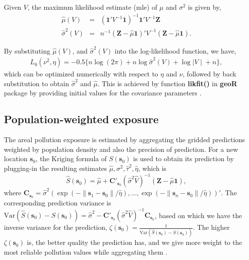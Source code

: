 \documentclass[12,]{article}
\begin{document}
Given \(V\), the maximum likelihood estimate (mle) of \(\mu\) and
\(\sigma^2\) is given by, \begin{eqnarray}
\hat{\mu} (V) &=& (\symbf{1}\prime V^{-1}\symbf{1})^{-1}\symbf{1}\prime V^{-1}\symbf{Z}\\\nonumber
\hat{\sigma}^2(V) &=& n^{-1}(\symbf{Z}- \hat{\mu}\symbf{1})\prime V^{-1} (\symbf{Z} - \hat{\mu}\symbf{1}).
\label{eq:gle}
\end{eqnarray}

By substituting \(\hat{\mu} (V)\), and \(\hat{\sigma}^2 (V)\) into the
log-likelihood function, we have, \begin{eqnarray}
L_0(\nu^2,\eta) = -0.5\{n\log(2\pi)+n\log \hat{\sigma}^2(V) + \log{\mid V\mid}+n\},
\label{eq:likelihood0}
\end{eqnarray} which can be optimized numerically with respect to
\(\eta\) and \(\nu\), followed by back substitution to obtain
\(\hat{\sigma}^2\) and \(\hat{\mu}\). This is achieved by function
\textbf{likfit()} in \textbf{geoR} package by providing initial values
for the covariance parameters \autocite{Diggle2007}.

\hypertarget{sec:weightedexposure}{%
\subsection{Population-weighted exposure}\label{sec:weightedexposure}}

The areal pollution exposure is estimated by aggregating the gridded
predictions weighted by population density and also the precision of
prediction. For a new location \(\symbf{s}_0\), the Kriging formula of
\(S(\symbf{s}_0)\) \autocite{Diggle2007} is used to obtain its
prediction by plugging-in the resulting estimates
\(\hat{\mu}, \sigma^2, \hat{\tau}^2, \hat{\eta}\), which is
\begin{equation}
\hat{S}(\symbf{s}_0) = \hat{\mu}+ \symbf{C}\prime_{\symbf{s}_0} (\hat{\sigma}^2 \hat{V})^{-1}(\symbf{Z}-\hat{\mu}\symbf{1}),
\label{eq:prediction}
\end{equation} where
\(\symbf{C}_{\symbf{s}_0}=\hat{\sigma}^2(\exp(-\|\symbf{s}_1-\symbf{s}_0\|/\hat{\eta}),\dots,\exp(-\|\symbf{s}_n-\symbf{s}_0\|/\hat{\eta}))\prime\).
The corresponding prediction variance is
\(\mbox{Var}(\hat{S}(\symbf{s}_0)-S(\symbf{s}_0))=\hat{\sigma}^2-\symbf{C}\prime_{\symbf{s}_0} (\hat{\sigma}^2 \hat{V})^{-1}\symbf{C}_{\symbf{s}_0}\),
based on which we have the inverse variance for the prediction,
\(\zeta(\symbf{s}_0)=\frac{1}{\mbox{Var}(\hat{S}(\symbf{s}_0)-S(\symbf{s}_0))}\).
The higher \(\zeta(\symbf{s}_0)\) is, the better quality the prediction
has, and we give more weight to the most reliable pollution values while
aggregating them \autocites{SanchezMeca1998}{LeeC2016}.
\end{document}

